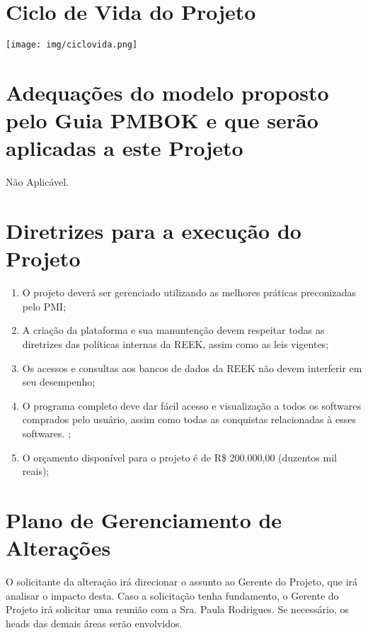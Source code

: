 \documentclass[12pt]{charter}
\begin{document}
\maketitle
\thispagestyle{empty}
\newpage

\section*{Ciclo de Vida do Projeto}
\label{sec:ciclovida}

\texttt{[image: img/ciclovida.png]}

\section*{Adequações do modelo proposto pelo Guia PMBOK\textsuperscript{\textregistered} e que serão aplicadas a este Projeto}
\label{sec:proposito}

Não Aplicável.

\section*{Diretrizes para a execução do Projeto}
\label{sec:diretrizes}

\begin{enumerate}
   \item O projeto deverá ser gerenciado utilizando as melhores práticas preconizadas pelo PMI;
   \item A criação da plataforma e sua manuntenção devem respeitar todas as diretrizes das políticas internas da REEK, assim como as leis vigentes;
   \item Os acessos e consultas aos bancos de dados da REEK não devem interferir em seu desempenho;
   \item O programa completo deve dar fácil acesso e visualização a todos os softwares comprados pelo usuário, assim como todas as conquistas relacionadas à esses softwares. ;
   \item O orçamento disponível para o projeto é de R\$ 200.000,00 (duzentos mil reais);
 
\end{enumerate}

\section*{Plano de Gerenciamento de Alterações}
\label{sec:mudanca}

O solicitante da alteração irá direcionar o assunto ao Gerente do Projeto, que irá analisar o impacto desta. Caso a solicitação tenha fundamento, o Gerente do Projeto irá solicitar uma reunião com a Sra. Paula Rodrigues. Se necessário, os heads das demais áreas serão envolvidos. \newline
\end{document}
